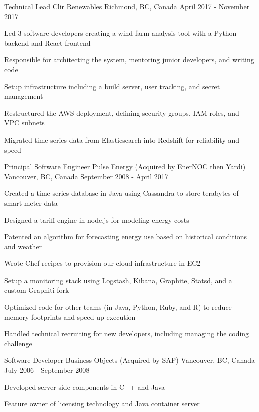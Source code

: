 \begin{cventries}
  \cventry
    {Technical Lead} %
    {Clir Renewables} %
    {Richmond, BC, Canada} %
    {April 2017 - November 2017} %
    {
      \begin{cvitems} %
        \item {Led 3 software developers creating a wind farm analysis tool with a Python backend and React frontend}
        \item {Responsible for architecting the system, mentoring junior developers, and writing code}
        \item {Setup infrastructure including a build server, user tracking, and secret management}
        \item {Restructured the AWS deployment, defining security groups, IAM roles, and VPC subnets}
        \item {Migrated time-series data from Elasticsearch into Redshift for reliability and speed}
      \end{cvitems}
    }


  \cventry
    {Principal Software Engineer} %
    {Pulse Energy (Acquired by EnerNOC then Yardi)} %
    {Vancouver, BC, Canada} %
    {September 2008 - April 2017} %
    {
      \begin{cvitems} %
        \item {Created a time-series database in Java using Cassandra to store terabytes of smart meter data}
        \item {Designed a tariff engine in node.js for modeling energy costs}
        \item {Patented an algorithm for forecasting energy use based on historical conditions and weather}
        \item {Wrote Chef recipes to provision our cloud infrastructure in EC2}
        \item {Setup a monitoring stack using Logstash, Kibana, Graphite, Statsd, and a custom Graphiti-fork}
        \item {Optimized code for other teams (in Java, Python, Ruby, and R) to reduce memory footprints and speed up execution}
        \item {Handled technical recruiting for new developers, including managing the coding challenge}
      \end{cvitems}
    }

  \cventry
    {Software Developer} %
    {Business Objects (Acquired by SAP)} %
    {Vancouver, BC, Canada} %
    {July 2006 - September 2008} %
    {
      \begin{cvitems} %
        \item {Developed server-side components in C++ and Java}
        \item {Feature owner of licensing technology and Java container server}
      \end{cvitems}
    }

\end{cventries}
